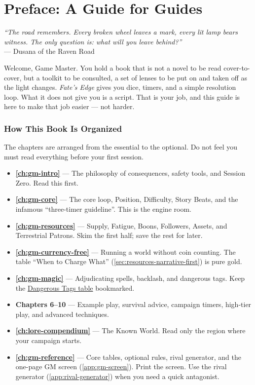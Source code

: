 \chapter*{Preface: A Guide for Guides}
\label{ch:gm-preface}

\textit{``The road remembers. Every broken wheel leaves a mark, every lit lamp bears witness. The only question is: what will you leave behind?''} \\
--- Dusana of the Raven Road

Welcome, Game Master. You hold a book that is not a novel to be read cover-to-cover, but a toolkit to be consulted, a set of lenses to be put on and taken off as the light changes. \textit{Fate's Edge} gives you dice, timers, and a simple resolution loop. What it does not give you is a script. That is your job, and this guide is here to make that job easier --- not harder.

\subsection*{How This Book Is Organized}

The chapters are arranged from the essential to the optional. Do not feel you must read everything before your first session.

\begin{itemize}
    \item \textbf{\autoref{ch:gm-intro}} --- The philosophy of consequences, safety tools, and Session Zero. Read this first.
    \item \textbf{\autoref{ch:gm-core}} --- The core loop, Position, Difficulty, Story Beats, and the infamous ``three-timer guideline''. This is the engine room.
    \item \textbf{\autoref{ch:gm-resources}} --- Supply, Fatigue, Boons, Followers, Assets, and Terrestrial Patrons. Skim the first half; save the rest for later.
    \item \textbf{\autoref{ch:gm-currency-free}} --- Running a world without coin counting. The table ``When to Charge What'' (\autoref{sec:resources-narrative-first}) is pure gold.
    \item \textbf{\autoref{ch:gm-magic}} --- Adjudicating spells, backlash, and dangerous tags. Keep the \hyperref[tab:dangerous-tags]{Dangerous Tags table} bookmarked.
    \item \textbf{Chapters 6--10} --- Example play, survival advice, campaign timers, high-tier play, and advanced techniques.
    \item \textbf{\autoref{ch:lore-compendium}} --- The Known World. Read only the region where your campaign starts.
    \item \textbf{\autoref{ch:gm-reference}} --- Core tables, optional rules, rival generator, and the one-page GM screen (\autoref{app:gm-screen}). Print the screen. Use the rival generator (\autoref{app:rival-generator}) when you need a quick antagonist.
\end{itemize}

